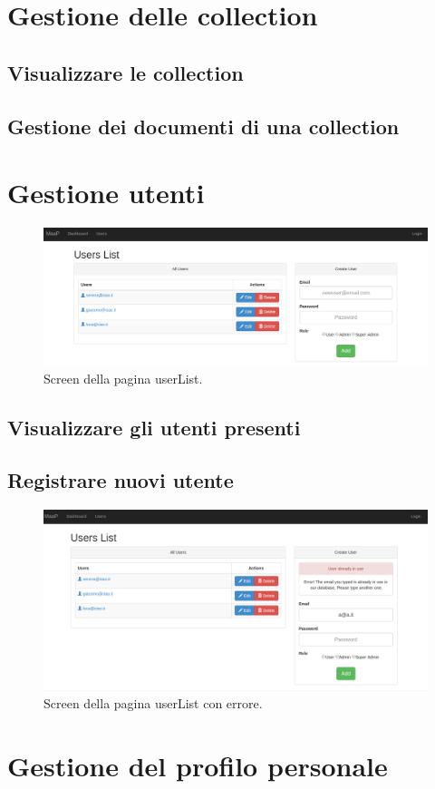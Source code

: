 \section{Gestione delle collection}
\subsection{Visualizzare le collection}
\subsection{Gestione dei documenti di una collection}

\section{Gestione utenti}

\begin{figure}[h]
	\centering \includegraphics[width=1\textwidth]{userList.png}
	\caption{Screen della pagina userList.}
\end{figure}

\subsection{Visualizzare gli utenti presenti}
\subsection{Registrare nuovi utente}
\label{nuovoutente}
\begin{figure}[h]
	\centering \includegraphics[width=1\textwidth]{userListError.png}
	\caption{Screen della pagina userList con errore. }
\end{figure}

\section{Gestione del profilo personale}






